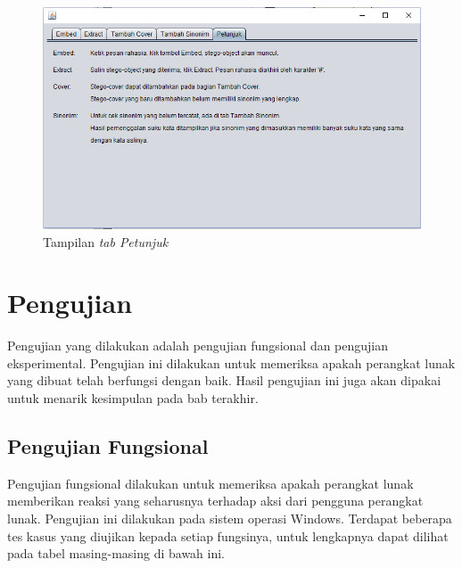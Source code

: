 \begin{figure}[H]
	\centering
	\includegraphics[scale=0.8]{Gambar/ui-petunjuk}
	\caption{Tampilan \textit{tab Petunjuk}} 
	\label{fig:ui-petunjuk}
\end{figure}

\section{Pengujian}
Pengujian yang dilakukan adalah pengujian fungsional dan pengujian eksperimental. Pengujian ini dilakukan untuk memeriksa apakah perangkat lunak yang dibuat telah berfungsi dengan baik. Hasil pengujian ini juga akan dipakai untuk menarik kesimpulan pada bab terakhir.

\subsection{Pengujian Fungsional}
Pengujian fungsional dilakukan untuk memeriksa apakah perangkat lunak memberikan reaksi yang seharusnya terhadap aksi dari pengguna perangkat lunak. Pengujian ini dilakukan pada sistem operasi Windows. Terdapat beberapa tes kasus yang diujikan kepada setiap fungsinya, untuk lengkapnya dapat dilihat pada tabel masing-masing di bawah ini.\\

